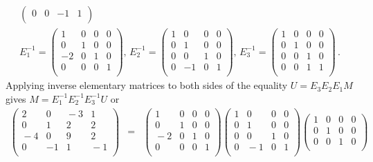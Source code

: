 \begin{example}
\begin{eqnarray*}
\begin{pmatrix}
0&0&-1&1\\
\end{pmatrix} \, 
\\[2mm] %
E_1^{-1}=
\begin{pmatrix}
1&0&0&0\\
0&1&0&0\\
-2&0&1&0\\
0&0&0&1\\
\end{pmatrix}  , \,
E_2^{-1}=
\begin{pmatrix}
1&0&0&0\\
0&1&0&0\\
0&0&1&0\\
0&-1&0&1\\
\end{pmatrix}  , \,
E_3^{-1}=
\begin{pmatrix}
1&0&0&0\\
0&1&0&0\\
0&0&1&0\\
0&0&1&1\\
\end{pmatrix} \, .
\end{eqnarray*}
Applying inverse elementary matrices to both sides of the equality  $U=E_3E_2E_1M$ gives 
$M=E_1^{-1}E_2^{-1}E_3^{-1}U$ or 
\begin{eqnarray*}
\begin{pmatrix}
2&0&\!\!-3&1\\
0&1&2&2\\
\!-4&0&9&2\\
0&-1&1&\!\!-1\\
\end{pmatrix}
\!\!\!\!\!\!&=&\!\!\!\!\!\!
\begin{pmatrix}
1&0&0&0\\
0&1&0&0\\
\!-2&0&1&0\\
0&0&0&1\\
\end{pmatrix} \!\!\!
\begin{pmatrix}
1&0&0&0\\
0&1&0&0\\
0&0&1&0\\
0&\!\!\!-1&0&1\\
\end{pmatrix}\!\!\!
\begin{pmatrix}
1&0&0&0\\
0&1&0&0\\
0&0&1&0\\

\end{pmatrix}
\end{eqnarray*}
\end{example}
